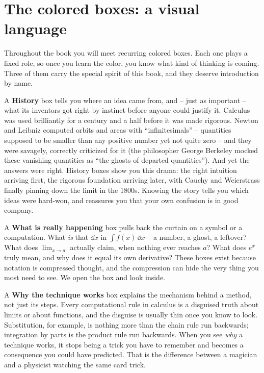 \section*{The colored boxes: a visual language}

Throughout the book you will meet recurring colored boxes. Each one plays a fixed role, so once you
learn the color, you know what kind of thinking is coming. Three of them carry the special spirit of
this book, and they deserve introduction by name.

\begin{historybox}
A \textbf{History} box tells you where an idea came from, and -- just as important -- what its
inventors got right by instinct before anyone could justify it. Calculus was used brilliantly for a
century and a half before it was made rigorous. Newton and Leibniz computed orbits and areas with
``infinitesimals'' -- quantities supposed to be smaller than any positive number yet not quite zero
-- and they were savagely, correctly criticized for it (the philosopher George Berkeley mocked these
vanishing quantities as ``the ghosts of departed quantities''). And yet the answers were right.
History boxes show you this drama: the right intuition arriving first, the rigorous foundation
arriving later, with Cauchy and Weierstrass finally pinning down the limit in the 1800s. Knowing the
story tells you which ideas were hard-won, and reassures you that your own confusion is in good
company.
\end{historybox}

\begin{happeningbox}
A \textbf{What is really happening} box pulls back the curtain on a symbol or a computation. What
\emph{is} that $\dd x$ in $\int f(x)\,\dd x$ -- a number, a ghost, a leftover? What does
$\lim_{x\to a}$ actually claim, when nothing ever reaches $a$? What does $e^x$ truly mean, and why
does it equal its own derivative? These boxes exist because notation is compressed thought, and the
compression can hide the very thing you most need to see. We open the box and look inside.
\end{happeningbox}

\begin{whybox}
A \textbf{Why the technique works} box explains the mechanism behind a method, not just its steps.
Every computational rule in calculus is a disguised truth about limits or about functions, and the
disguise is usually thin once you know to look. Substitution, for example, is nothing more than the
chain rule run backwards; integration by parts is the product rule run backwards. When you see
\emph{why} a technique works, it stops being a trick you have to remember and becomes a consequence
you could have predicted. That is the difference between a magician and a physicist watching the
same card trick.
\end{whybox}

